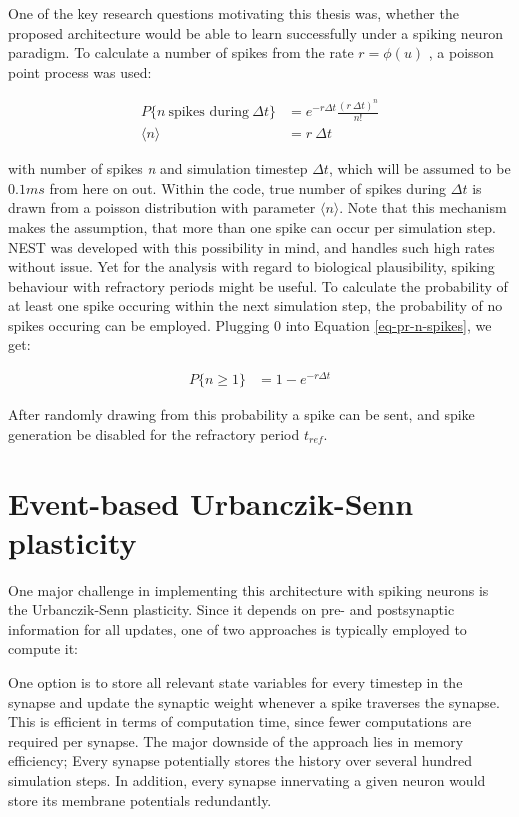 One of the key research questions motivating this thesis was, whether the proposed architecture would be able to
learn successfully under a spiking neuron paradigm. To calculate a number of spikes from the rate $r = \phi(u)$
, a poisson point process was used:

\begin{align}
  P\{\textit{n} \ \text{spikes during} \ \Delta t\} & = e^{-r \Delta t} \frac{(r \ \Delta t) ^ n}{n!}\label{eq-pr-n-spikes} \\
  \langle \textit{n} \rangle                        & = r \ \Delta t
\end{align}

with number of spikes \textit{n} and simulation timestep $\Delta t$, which will be assumed to be $0.1 ms$ from here
on out. Within the code, true number of spikes during $\Delta t$ is drawn from a poisson distribution with parameter $\langle n \rangle$.
Note that this mechanism makes the assumption, that more than one spike can occur per simulation step. NEST was
developed with this possibility in mind, and handles such high rates without issue. Yet for the analysis with regard to biological
plausibility, spiking behaviour with refractory periods might be useful. To calculate the probability of at least
one spike occuring within the next simulation step, the probability of no spikes occuring can be employed. Plugging 0
into Equation \ref{eq-pr-n-spikes}, we get:

\begin{align}
  P\{ \textit{n} \geq 1\} & = 1 - e^{-r \Delta t}
\end{align}

After randomly drawing from this probability a spike can be sent, and spike generation be disabled for the refractory
period $t_{ref}$. 


\section{Event-based Urbanczik-Senn plasticity}

One major challenge in implementing this architecture with spiking neurons is the Urbanczik-Senn plasticity. Since it 
depends on pre- and postsynaptic information for all updates, one of two approaches is typically employed to compute
it:

One option is to store all relevant state variables for every timestep in the synapse and update the synaptic weight whenever
a spike traverses the synapse. This is efficient in terms of computation time, since fewer computations are required
per synapse. The major downside of the approach lies in memory efficiency; Every synapse potentially stores the history
over several hundred simulation steps. In addition, every synapse innervating a given neuron would store its membrane 
potentials redundantly.

